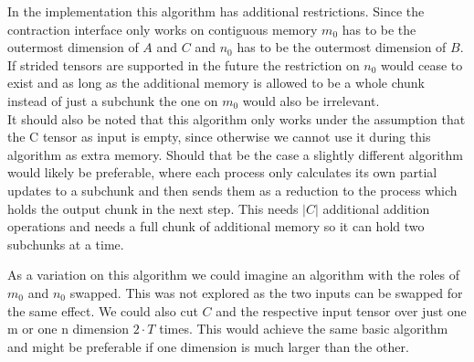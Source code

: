 In the implementation this algorithm has additional restrictions.
Since the contraction interface only works on contiguous memory $m_0$ has to be the outermost dimension of $A$ and $C$ and $n_0$ has to be the outermost dimension of $B$.
If strided tensors are supported in the future the restriction on $n_0$ would cease to exist and as long as the additional memory is allowed to be a whole chunk instead of just a subchunk the one on $m_0$ would also be irrelevant.\\
It should also be noted that this algorithm only works under the assumption that the C tensor as input is empty, since otherwise we cannot use it during this algorithm as extra memory.
Should that be the case a slightly different algorithm would likely be preferable, where each process only calculates its own partial updates to a subchunk and then sends them as a reduction to the process which holds the output chunk in the next step.
This needs $|C|$ additional addition operations and needs a full chunk of additional memory so it can hold two subchunks at a time.

As a variation on this algorithm we could imagine an algorithm with the roles of $m_0$ and $n_0$ swapped.
This was not explored as the two inputs can be swapped for the same effect.
We could also cut $C$ and the respective input tensor over just one m or one n dimension $2 \cdot T$ times.
This would achieve the same basic algorithm and might be preferable if one dimension is much larger than the other.
